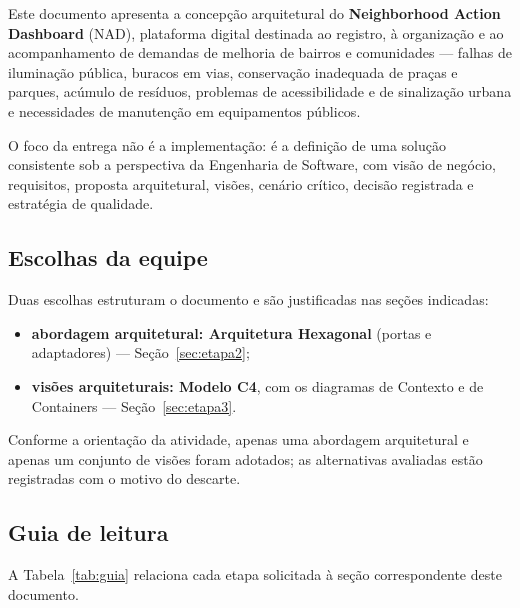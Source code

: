 \documentclass[12pt,a4paper,oneside]{article}
\begin{document}
Este documento apresenta a concepção arquitetural do \textbf{Neighborhood Action
Dashboard} (NAD), plataforma digital destinada ao registro, à organização e ao
acompanhamento de demandas de melhoria de bairros e comunidades — falhas de
iluminação pública, buracos em vias, conservação inadequada de praças e parques,
acúmulo de resíduos, problemas de acessibilidade e de sinalização urbana e
necessidades de manutenção em equipamentos públicos.

O foco da entrega não é a implementação: é a definição de uma solução
consistente sob a perspectiva da Engenharia de Software, com visão de negócio,
requisitos, proposta arquitetural, visões, cenário crítico, decisão registrada e
estratégia de qualidade.

\subsection{Escolhas da equipe}

Duas escolhas estruturam o documento e são justificadas nas seções indicadas:

\begin{itemize}[leftmargin=*,itemsep=2pt,topsep=4pt]
  \item \textbf{abordagem arquitetural: Arquitetura Hexagonal} (portas e
        adaptadores) — Seção~\ref{sec:etapa2};
  \item \textbf{visões arquiteturais: Modelo C4}, com os diagramas de Contexto e
        de Containers — Seção~\ref{sec:etapa3}.
\end{itemize}

Conforme a orientação da atividade, apenas uma abordagem arquitetural e apenas
um conjunto de visões foram adotados; as alternativas avaliadas estão
registradas com o motivo do descarte.

\subsection{Guia de leitura}

A Tabela~\ref{tab:guia} relaciona cada etapa solicitada à seção correspondente
deste documento.
\end{document}
